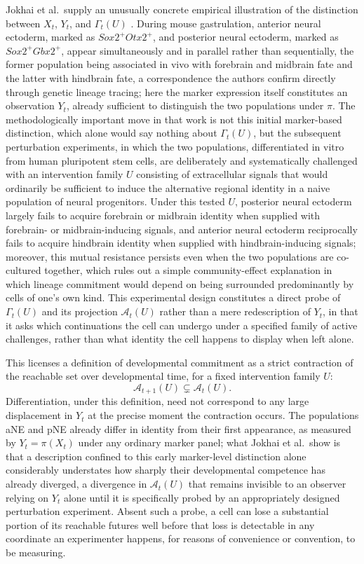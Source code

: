 \documentclass[11pt]{article}
\begin{document}
Jokhai et al.\ supply an unusually concrete empirical illustration of the distinction between $X_t$, $Y_t$, and $\Gamma_t(U)$ \cite{jokhai2026}. During mouse gastrulation, anterior neural ectoderm, marked as $Sox2^{+}Otx2^{+}$, and posterior neural ectoderm, marked as $Sox2^{+}Gbx2^{+}$, appear simultaneously and in parallel rather than sequentially, the former population being associated in vivo with forebrain and midbrain fate and the latter with hindbrain fate, a correspondence the authors confirm directly through genetic lineage tracing; here the marker expression itself constitutes an observation $Y_t$, already sufficient to distinguish the two populations under $\pi$. The methodologically important move in that work is not this initial marker-based distinction, which alone would say nothing about $\Gamma_t(U)$, but the subsequent perturbation experiments, in which the two populations, differentiated in vitro from human pluripotent stem cells, are deliberately and systematically challenged with an intervention family $U$ consisting of extracellular signals that would ordinarily be sufficient to induce the alternative regional identity in a naive population of neural progenitors. Under this tested $U$, posterior neural ectoderm largely fails to acquire forebrain or midbrain identity when supplied with forebrain- or midbrain-inducing signals, and anterior neural ectoderm reciprocally fails to acquire hindbrain identity when supplied with hindbrain-inducing signals; moreover, this mutual resistance persists even when the two populations are co-cultured together, which rules out a simple community-effect explanation in which lineage commitment would depend on being surrounded predominantly by cells of one's own kind. This experimental design constitutes a direct probe of $\Gamma_t(U)$ and its projection $\mathcal{A}_t(U)$ rather than a mere redescription of $Y_t$, in that it asks which continuations the cell can undergo under a specified family of active challenges, rather than what identity the cell happens to display when left alone.

This licenses a definition of developmental commitment as a strict contraction of the reachable set over developmental time, for a fixed intervention family $U$:
\begin{equation}
\mathcal{A}_{t+1}(U) \subsetneq \mathcal{A}_t(U).
\end{equation}
Differentiation, under this definition, need not correspond to any large displacement in $Y_t$ at the precise moment the contraction occurs. The populations aNE and pNE already differ in identity from their first appearance, as measured by $Y_t = \pi(X_t)$ under any ordinary marker panel; what Jokhai et al.\ show is that a description confined to this early marker-level distinction alone considerably understates how sharply their developmental competence has already diverged, a divergence in $\mathcal{A}_t(U)$ that remains invisible to an observer relying on $Y_t$ alone until it is specifically probed by an appropriately designed perturbation experiment. Absent such a probe, a cell can lose a substantial portion of its reachable futures well before that loss is detectable in any coordinate an experimenter happens, for reasons of convenience or convention, to be measuring.
\end{document}
